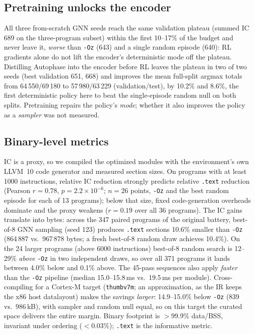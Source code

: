 \documentclass[conference,a4paper]{IEEEtran}
\begin{document}
\subsection{Pretraining unlocks the encoder}
All three from-scratch GNN seeds reach the same validation plateau
(summed IC 689 on the three-program subset) within the first 10--17\%
of the budget and never leave it, \emph{worse} than \texttt{-Oz} (643)
and a single random episode (640): RL gradients alone do not lift the
encoder's deterministic mode off the plateau. Distilling Autophase into
the encoder before RL leaves the plateau in two of two seeds (best
validation 651, 668) and improves the mean full-split argmax totals
from 64\,550/69\,180 to 57\,980/63\,229 (validation/test), by 10.2\%
and 8.6\%, the first deterministic policy here to beat the
single-episode random null on both splits. Pretraining repairs the
policy's \emph{mode}; whether it also improves the policy as a
\emph{sampler} was not measured.

\subsection{Binary-level metrics}
\label{sec:binary}
IC is a proxy, so we compiled the optimized modules with the
environment's own LLVM~10 code generator and measured section sizes.
On programs with at least 1000 instructions, relative IC reduction
strongly predicts relative \texttt{.text} reduction (Pearson
$r{=}0.78$, $p{=}2.2{\times}10^{-6}$; $n{=}26$ points, \texttt{-Oz}
and the best random episode for each of 13 programs); below that
size, fixed code-generation overheads dominate
and the proxy weakens ($r{=}0.19$ over all 36 programs). The IC gains
translate into bytes: across the
347 paired programs of the original battery, best-of-8 GNN sampling
(seed 123) produces \texttt{.text} sections 10.6\% smaller than \texttt{-Oz}
(864\,887 vs.\ 967\,878 bytes; a fresh best-of-8 random draw achieves
10.4\%). On the 24 larger programs (above 6000 instructions) best-of-8
random search is 12--29\% \emph{above} \texttt{-Oz} in two independent
draws, so over all 371 programs it lands between 4.0\% below and 0.1\%
above. The 45-pass sequences also apply \emph{faster} than the
\texttt{-Oz} pipeline (median 15.0--15.8\,ms vs.\ 19.5\,ms per module).
Cross-compiling for a Cortex-M target (\texttt{thumbv7m}; an
approximation, as the IR keeps the x86 host datalayout) makes the
savings \emph{larger}: 14.9--15.0\% below \texttt{-Oz} (839 vs.\
986\,kB), with sampler and random null equal, so on this target the
curated space delivers the entire margin. Binary footprint is $>$99.9\% data/BSS, invariant under ordering
($<$0.03\%); \texttt{.text} is the informative metric.
\end{document}
